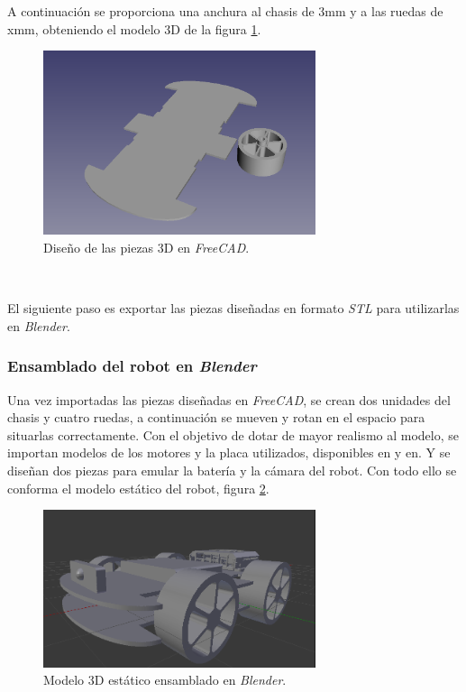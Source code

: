 A continuación se proporciona una anchura al chasis de 3mm y a las ruedas de xmm, obteniendo el modelo 3D de la figura \ref{fig:design3Dfreecad}.\\

\begin{figure} [h!]
	\begin{center}
		\includegraphics[width=8cm]{figs/freecad}
	\end{center}
	\caption{Diseño de las piezas 3D en \textit{FreeCAD}.}
	\label{fig:design3Dfreecad}
\end{figure}\

El siguiente paso es exportar las piezas diseñadas en formato \textit{STL} para utilizarlas en \textit{Blender}.\\

\subsubsection{Ensamblado del robot en \textit{Blender}}

Una vez importadas las piezas diseñadas en \textit{FreeCAD}, se crean dos unidades del chasis y cuatro ruedas, a continuación se mueven y rotan en el espacio para situarlas correctamente. Con el objetivo de dotar de mayor realismo al modelo, se importan modelos de los motores y la placa utilizados, disponibles en y en. Y se diseñan dos piezas para emular la batería y la cámara del robot. Con todo ello se conforma el modelo estático del robot, figura \ref{fig:blendermodel}.\\

\begin{figure} [h!]
	\begin{center}
		\includegraphics[width=8cm]{figs/blenderModel}
	\end{center}
	\caption{Modelo 3D estático ensamblado en \textit{Blender}.}
	\label{fig:blendermodel}
\end{figure}\

